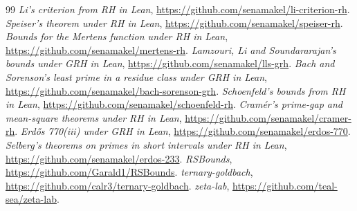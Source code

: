 \documentclass[11pt]{amsart}
\begin{document}
\begin{thebibliography}{99}
 \emph{Li's criterion from RH in Lean}, \url{https://github.com/senamakel/li-criterion-rh}.
 \emph{Speiser's theorem under RH in Lean}, \url{https://github.com/senamakel/speiser-rh}.
 \emph{Bounds for the Mertens function under RH in Lean}, \url{https://github.com/senamakel/mertens-rh}.
 \emph{Lamzouri, Li and Soundararajan's bounds under GRH in Lean}, \url{https://github.com/senamakel/lls-grh}.
 \emph{Bach and Sorenson's least prime in a residue class under GRH in Lean}, \url{https://github.com/senamakel/bach-sorenson-grh}.
 \emph{Schoenfeld's bounds from RH in Lean}, \url{https://github.com/senamakel/schoenfeld-rh}.
 \emph{Cram\'er's prime-gap and mean-square theorems under RH in Lean}, \url{https://github.com/senamakel/cramer-rh}.
 \emph{Erd\H{o}s 770(iii) under GRH in Lean}, \url{https://github.com/senamakel/erdos-770}.
 \emph{Selberg's theorems on primes in short intervals under RH in Lean}, \url{https://github.com/senamakel/erdos-233}.
 \emph{RSBounds}, \url{https://github.com/Garald1/RSBounds}.
 \emph{ternary-goldbach}, \url{https://github.com/calr3/ternary-goldbach}.
 \emph{zeta-lab}, \url{https://github.com/teal-sea/zeta-lab}.
\end{thebibliography}
\end{document}
